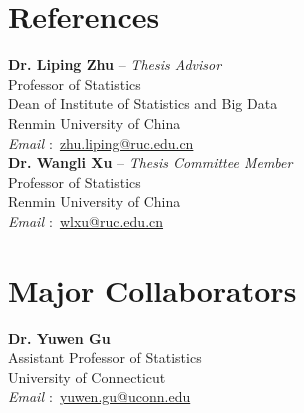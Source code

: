 \documentclass[margin,line]{resume-bib}
\begin{document}
\begin{resume}
\section{\mysidestyle References} 
\vspace{0mm}
\begin{multicols}{2}
\textbf{Dr. Liping Zhu} -- \emph{Thesis Advisor} \\
\indent \hspace{3mm} Professor of Statistics\\ 
\indent \hspace{3mm} Dean of Institute of Statistics and Big Data \\
\indent \hspace{3mm} Renmin University of China \\
\indent \hspace{3mm} \emph{Email $\!:$} \href{mailto:zhu.liping@ruc.edu.cn}{zhu.liping@ruc.edu.cn} \\

\vspace{-3mm}
\textbf{Dr. Wangli Xu} -- \emph{Thesis Committee Member}  \\
\indent \hspace{3mm} Professor of Statistics \\
\indent \hspace{3mm} Renmin University of China \\
\indent \hspace{3mm} \emph{Email $\!:$} \href{mailto:wlxu@ruc.edu.cn}{wlxu@ruc.edu.cn} \\
\end{multicols}

\section{\mysidestyle Major Collaborators}  \vspace{0mm}


\begin{multicols}{2}
{
\begingroup

\vspace{0mm}
\textbf{Dr. Yuwen Gu} \\
\indent \hspace{3mm} Assistant Professor of Statistics \\
\indent \hspace{3mm} University of Connecticut \\
\indent \hspace{3mm} \emph{Email $\!:$} \href{mailto:yuwen.gu@uconn.edu}{yuwen.gu@uconn.edu} \\


}
\end{multicols}
\end{resume}
\end{document}
